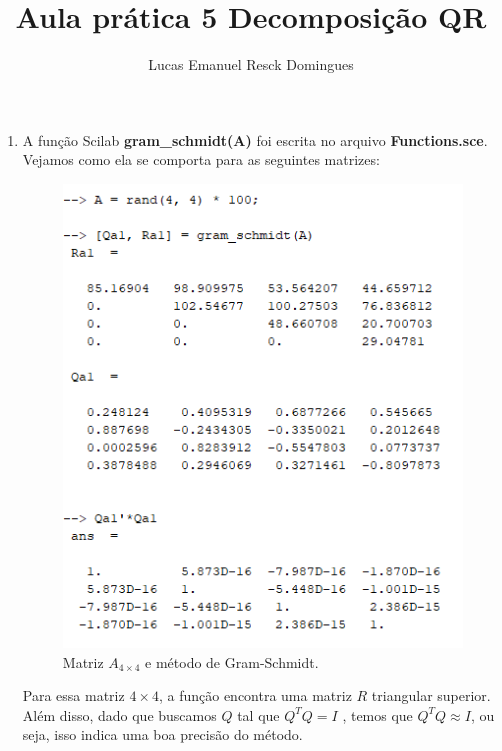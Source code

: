 \documentclass[11pt]{article}
\begin{document}
    \author{Lucas Emanuel Resck Domingues}
    \title{Aula prática 5
    \medbreak
    \large Decomposição QR}
    \maketitle
    
    \medskip
    
    \begin{enumerate}
    
        \item %
        
            A função Scilab \textbf{gram\_schmidt(A)} foi escrita no arquivo \textbf{Functions.sce}. Vejamos como ela se comporta para as seguintes matrizes:
        
            \begin{figure}[H]
                \centering
                \includegraphics[]{1-1}
                \caption{Matriz $A_{4\times4}$ e método de Gram-Schmidt.}
            \end{figure}
        
            Para essa matriz $4\times4$, a função encontra uma matriz $R$ triangular superior. Além disso, dado que buscamos $Q$ tal que $Q^TQ = I$ , temos que $Q^TQ \approx I$, ou seja, isso indica uma boa precisão do método.
        

\end{enumerate}
\end{document}
